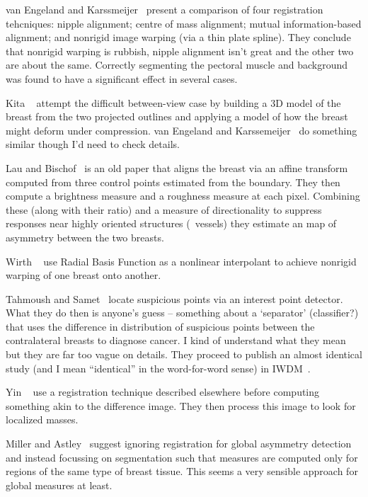 van Engeland and Karssmeijer~\cite{vanEngeland_etal_TMI03} present a comparison of four registration tehcniques: nipple alignment; centre of mass alignment; mutual information-based alignment; and nonrigid image warping (via a thin plate spline). They conclude that nonrigid warping is rubbish, nipple alignment isn't great and the other two are about the same. Correctly segmenting the pectoral muscle and background was found to have a significant effect in several cases.

Kita \etal~\cite{Kita_etal_CVPR98} attempt the difficult between-view case by building a 3D model of the breast from the two projected outlines and applying a model of how the breast might deform under compression. van Engeland and Karssemeijer~\cite{vanEngeland_Karssemeijer_IWDM06} do something similar though I'd need to check details.

Lau and Bischof~\cite{Lau_Bischof_CBR91} is an old paper that aligns the breast via an affine transform computed from three control points estimated from the boundary. They then compute a brightness measure and a roughness measure at each pixel. Combining these (along with their ratio) and a measure of directionality to suppress responses near highly oriented structures (\eg~vessels) they estimate an map of asymmetry between the two breasts.

Wirth \etal~\cite{Wirth_etal_IPA99} use Radial Basis Function as a nonlinear interpolant to achieve nonrigid warping of one breast onto another.

Tahmoush and Samet~\cite{Tahmoush_Samet_SPIE06} locate suspicious points via an interest point detector. What they do then is anyone's guess -- something about a `separator' (classifier?) that uses the difference in distribution of suspicious points between the contralateral breasts to diagnose cancer. I kind of understand what they mean but they are far too vague on details. They proceed to publish an almost identical study (and I mean ``identical'' in the word-for-word sense) in IWDM~\cite{Tahmoush_etal_IWDM06}.

Yin \etal~\cite{Yin_etal_JDI94} use a registration technique described elsewhere before computing something akin to the difference image. They then process this image to look for localized masses.

Miller and Astley~\cite{Miller_Astley_BMVC93} suggest ignoring registration for global asymmetry detection and instead focussing on segmentation such that measures are computed only for regions of the same type of breast tissue. This seems a very sensible approach for global measures at least.


